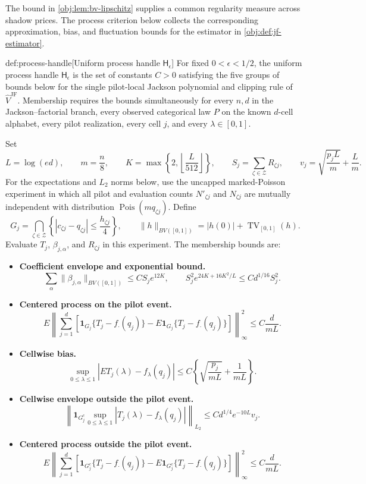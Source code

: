 The bound in \cref{obj:lem:bv-lipschitz} supplies a common regularity measure across shadow prices. The process criterion below collects the corresponding approximation, bias, and fluctuation bounds for the estimator in \cref{obj:def:jf-estimator}.

\begin{definitionv}{def:process-handle}[Uniform process handle $\mathsf H_\epsilon$]
For fixed \(0<\epsilon<1/2\), the uniform process handle \(\mathsf H_\epsilon\) is the set of constants \(C>0\) satisfying the five groups of bounds below for the single pilot-local Jackson polynomial and clipping rule of \(\widehat V^{\mathrm{JF}}\). Membership requires the bounds simultaneously for every \(n,d\) in the Jackson–factorial branch, every observed categorical law \(P\) on the known \(d\)-cell alphabet, every pilot realization, every cell \(j\), and every \(\lambda\in[0,1]\).

Set
\[
L=\log(ed),\qquad
m=\frac n8,\qquad
K=\max\left\{2,\left\lfloor\frac L{512}\right\rfloor\right\},
\qquad
S_j=\sum_{\zeta\in\mathcal Z}R_{\zeta j},
\qquad
v_j=\sqrt{\frac{p_jL}{m}}+\frac Lm.
\]
For the expectations and \(L_2\) norms below, use the uncapped marked-Poisson experiment in which all pilot and evaluation counts \(N'_{\zeta j}\) and \(N_{\zeta j}\) are mutually independent with distribution \(\operatorname{Pois}(m q_{\zeta j})\). Define
\[
G_j
=
\bigcap_{\zeta\in\mathcal Z}
\left\{
|c_{\zeta j}-q_{\zeta j}|
\leq \frac{h_{\zeta j}}4
\right\},
\qquad
\|h\|_{BV([0,1])}
=
|h(0)|+\operatorname{TV}_{[0,1]}(h).
\]
Evaluate \(T_j\), \(\beta_{j,\alpha}\), and \(R_{\zeta j}\) in this experiment. The membership bounds are:
\begin{itemize}
\item \textbf{Coefficient envelope and exponential bound.}
\[
\sum_\alpha\|\beta_{j,\alpha}\|_{BV([0,1])}
\leq C S_j e^{12K},
\qquad
S_j^2 e^{24K+16K^2/L}
\leq C d^{1/16}S_j^2.
\]

\item \textbf{Centered process on the pilot event.}
\[
E\left\|
\sum_{j=1}^d
\left[
\mathbf1_{G_j}\{T_j-f_\cdot(q_j)\}
-
E\mathbf1_{G_j}\{T_j-f_\cdot(q_j)\}
\right]
\right\|_\infty^2
\leq C\frac d{mL}.
\]

\item \textbf{Cellwise bias.}
\[
\sup_{0\leq\lambda\leq1}
\left|ET_j(\lambda)-f_\lambda(q_j)\right|
\leq
C\left\{\sqrt{\frac{p_j}{mL}}+\frac1{mL}\right\}.
\]

\item \textbf{Cellwise envelope outside the pilot event.}
\[
\left\|
\mathbf1_{G_j^c}
\sup_{0\leq\lambda\leq1}
|T_j(\lambda)-f_\lambda(q_j)|
\right\|_{L_2}
\leq
C d^{1/4}e^{-10L}v_j.
\]

\item \textbf{Centered process outside the pilot event.}
\[
E\left\|
\sum_{j=1}^d
\left[
\mathbf1_{G_j^c}\{T_j-f_\cdot(q_j)\}
-
E\mathbf1_{G_j^c}\{T_j-f_\cdot(q_j)\}
\right]
\right\|_\infty^2
\leq C\frac d{mL}.
\]
\end{itemize}
\end{definitionv}

